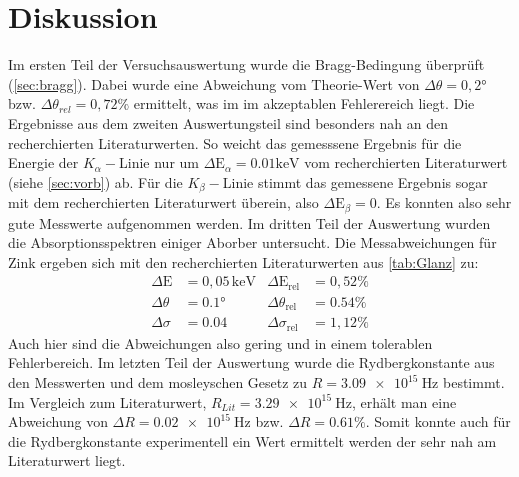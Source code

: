 \section{Diskussion}
\label{sec:Diskussion}
Im ersten Teil der Versuchsauswertung wurde die Bragg-Bedingung überprüft (\autoref{sec:bragg}). Dabei wurde eine Abweichung vom Theorie-Wert von $\Delta \theta=0,2°$ bzw. $\Delta \theta_{rel}=0,72\%$ ermittelt, was im im akzeptablen Fehlerereich liegt. \newline 
Die Ergebnisse aus dem zweiten Auswertungsteil sind besonders nah an den recherchierten Literaturwerten. So weicht das gemesssene Ergebnis für die Energie der $K_\alpha-$Linie nur um $\Delta \text{E}_\alpha=0.01 \text{keV}$ vom recherchierten Literaturwert (siehe \autoref{sec:vorb}) ab. Für die $K_\beta-$Linie stimmt das gemessene Ergebnis sogar mit dem recherchierten Literaturwert überein, also $\Delta \text{E}_\beta=0$. Es konnten also sehr gute Messwerte aufgenommen werden. \newline
Im dritten Teil der Auswertung wurden die Absorptionsspektren einiger Aborber untersucht. Die Messabweichungen für Zink ergeben sich mit den recherchierten Literaturwerten aus \autoref{tab:Glanz} zu:
\begin{align*}
    \Delta\text{E}&=0,05 \, \mathrm{keV} & \Delta\text{E}_\text{rel}&=0,52\%\\
    \Delta\theta&=0.1° & \Delta\theta_\text{rel}&=0.54\%\\
    \Delta\sigma&=0.04 & \Delta\sigma_\text{rel}&=1,12\%
\end{align*}
\noindent
Auch hier sind die Abweichungen also gering und in einem tolerablen Fehlerbereich.\newline
Im letzten Teil der Auswertung wurde die Rydbergkonstante aus den Messwerten und dem mosleyschen Gesetz zu $R = \SI{3.09e15}{\hertz}$ bestimmt. Im Vergleich zum Literaturwert, $R_{Lit}=\SI{3.29e15}{\hertz}$\cite{q}, erhält man eine Abweichung von $\Delta R =\SI{0.02e15}{\hertz}$ bzw. $\Delta R =0.61\%$. Somit konnte auch für die Rydbergkonstante experimentell ein Wert ermittelt werden der sehr nah am Literaturwert liegt.